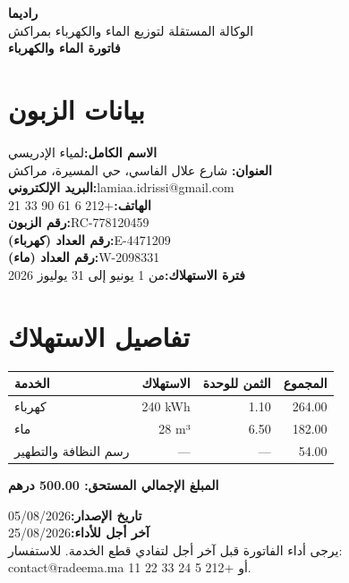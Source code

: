 \documentclass[12pt,a4paper]{article}
\newcommand{\field}[2]{\textbf{#1:}\quad #2\\[0.3em]}
\begin{document}
{\Huge\bfseries\color{accent} راديما}\\[0.2em]
{\normalsize الوكالة المستقلة لتوزيع الماء والكهرباء بمراكش}\\[0.8em]
{\LARGE\bfseries فاتورة الماء والكهرباء}

\section{بيانات الزبون}
\field{الاسم الكامل}{لمياء الإدريسي}
\field{العنوان}{56 شارع علال الفاسي، حي المسيرة، مراكش}
\field{البريد الإلكتروني}{\textenglish{lamiaa.idrissi@gmail.com}}
\field{الهاتف}{\textenglish{+212 6 61 90 33 21}}
\field{رقم الزبون}{\textenglish{RC-778120459}}
\field{رقم العداد (كهرباء)}{\textenglish{E-4471209}}
\field{رقم العداد (ماء)}{\textenglish{W-2098331}}
\field{فترة الاستهلاك}{من 1 يونيو إلى 31 يوليوز 2026}

\section{تفاصيل الاستهلاك}
\begin{tabularx}{\linewidth}{@{}X r r r@{}}
\textbf{الخدمة} & \textbf{الاستهلاك} & \textbf{الثمن للوحدة} & \textbf{المجموع}\\ \hline
كهرباء & \textenglish{240 kWh} & \textenglish{1.10} & \textenglish{264.00} \\
ماء & \textenglish{28 m³} & \textenglish{6.50} & \textenglish{182.00} \\
رسم النظافة والتطهير & --- & --- & \textenglish{54.00} \\
\end{tabularx}

\vspace{0.6em}
\hfill\textbf{المبلغ الإجمالي المستحق: \textenglish{500.00} درهم}

\vspace{0.8em}
\field{تاريخ الإصدار}{\textenglish{05/08/2026}}
\field{آخر أجل للأداء}{\textenglish{25/08/2026}}

\vspace{0.8em}
{\small يرجى أداء الفاتورة قبل آخر أجل لتفادي قطع الخدمة. للاستفسار: \textenglish{contact@radeema.ma} أو \textenglish{+212 5 24 33 22 11}.}
\end{document}
